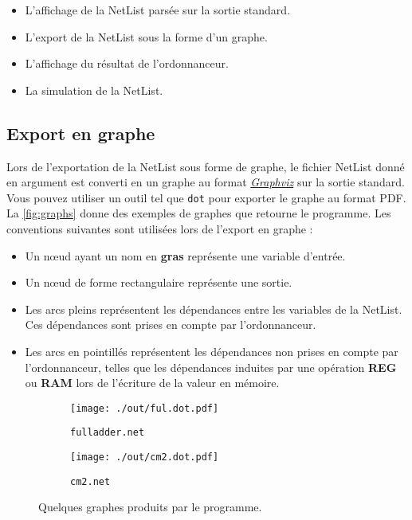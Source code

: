 \documentclass[french, 12pt]{article}
\begin{document}
\begin{itemize}
      \item L'affichage de la NetList parsée sur la sortie standard.
      \item L'export de la NetList sous la forme d'un graphe.
      \item L'affichage du résultat de l'ordonnanceur.
      \item La simulation de la NetList.
\end{itemize}

\subsection{Export en graphe}

Lors de l'exportation de la NetList sous forme de graphe, le fichier NetList donné en argument est converti en un graphe
au format \href{https://graphviz.org/}{\textit{Graphviz}} sur la sortie standard.
Vous pouvez utiliser un outil tel que \verb|dot| pour exporter le graphe au format PDF.
La \autoref{fig:graphs} donne des exemples de graphes que retourne le programme.
Les conventions suivantes sont utilisées lors de l'export en graphe :
\begin{itemize}
      \item Un n\oe{}ud ayant un nom en \textbf{gras} représente une variable d'entrée.
      \item Un n\oe{}ud de forme rectangulaire représente une sortie.
      \item Les arcs pleins représentent les dépendances entre les variables de la
            NetList. Ces dépendances sont prises en compte par l'ordonnanceur.
      \item Les arcs en pointillés représentent les dépendances non prises en
            compte par l'ordonnanceur, telles que les dépendances induites par une
            opération \textbf{REG} ou \textbf{RAM} lors de l'écriture de la valeur
            en mémoire.
\end{itemize}

\begin{figure}[htp]
      \centering
      \begin{subfigure}{.62\textwidth}
            \begin{center}
                  \texttt{[image: ./out/ful.dot.pdf]}
            \end{center}
            \caption{\texttt{fulladder.net}}
            \label{fig:sub1}
      \end{subfigure}%
      \begin{subfigure}{.38\textwidth}
            \begin{center}
                  \texttt{[image: ./out/cm2.dot.pdf]}
            \end{center}
            \caption{\texttt{cm2.net}}
            \label{fig:sub2}
      \end{subfigure}
      \caption{Quelques graphes produits par le programme.}
      \label{fig:graphs}
\end{figure}
\end{document}
